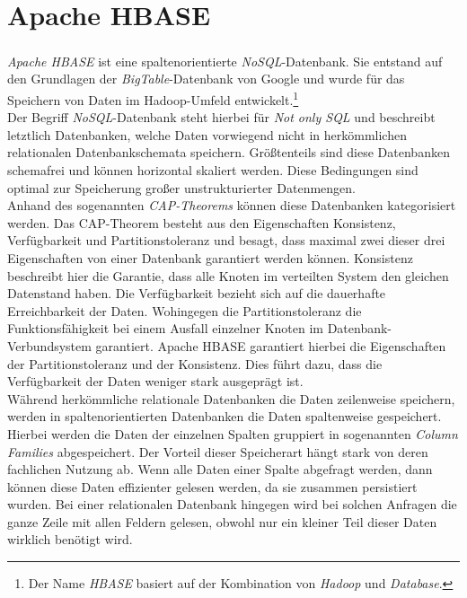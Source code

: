 \section{Apache HBASE}
\label{sec:theory_hbase}
\textit{Apache HBASE\textsuperscript{\textregistered}} ist eine spaltenorientierte \textit{NoSQL}-Datenbank. Sie entstand auf den Grundlagen der \textit{BigTable}-Datenbank von Google und wurde für das Speichern von Daten im Hadoop-Umfeld entwickelt.\footnote{Der Name \textit{HBASE} basiert auf der Kombination von \textit{Hadoop} und \textit{Database}.}\\
Der Begriff \textit{NoSQL}-Datenbank steht hierbei für \textit{Not only SQL} und beschreibt letztlich Datenbanken, welche Daten vorwiegend nicht in herkömmlichen relationalen Datenbankschemata speichern. Größtenteils sind diese Datenbanken schemafrei und können horizontal skaliert werden. Diese Bedingungen sind optimal zur Speicherung großer unstrukturierter Datenmengen.\\
Anhand des sogenannten \textit{CAP-Theorems} können diese Datenbanken kategorisiert werden.
Das CAP-Theorem besteht aus den Eigenschaften Konsistenz, Verfügbarkeit und Partitionstoleranz und besagt, dass maximal zwei dieser drei Eigenschaften von einer Datenbank garantiert werden können. Konsistenz beschreibt hier die Garantie, dass alle Knoten im verteilten System den gleichen Datenstand haben. Die Verfügbarkeit bezieht sich auf die dauerhafte Erreichbarkeit der Daten. Wohingegen die Partitionstoleranz die Funktionsfähigkeit bei einem Ausfall einzelner Knoten im Datenbank-Verbundsystem garantiert.
Apache HBASE garantiert hierbei die Eigenschaften der Partitionstoleranz und der Konsistenz. Dies führt dazu, dass die Verfügbarkeit der Daten weniger stark ausgeprägt ist.
\cite[S. 189 ff.]{big_data_praxis}\\

\noindent
Während herkömmliche relationale Datenbanken die Daten zeilenweise speichern, werden in spaltenorientierten Datenbanken die Daten spaltenweise gespeichert. Hierbei werden die Daten der einzelnen Spalten gruppiert in sogenannten \textit{Column Families} abgespeichert. Der Vorteil dieser Speicherart hängt stark von deren fachlichen Nutzung ab. Wenn alle Daten einer Spalte abgefragt werden, dann können diese Daten effizienter gelesen werden, da sie zusammen persistiert wurden. Bei einer relationalen Datenbank hingegen wird bei solchen Anfragen die ganze Zeile mit allen Feldern gelesen, obwohl nur ein kleiner Teil dieser Daten wirklich benötigt wird.\\


